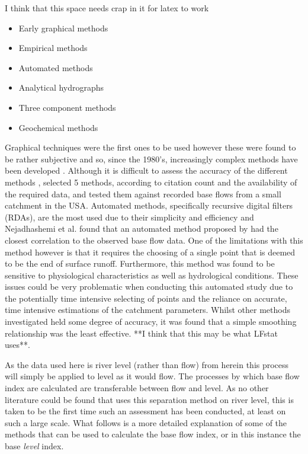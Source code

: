 \documentclass[DIV=calc, paper=a4, fontsize=11pt, twocolumn]{scrartcl}	 %
\begin{document}
I think that this space needs crap in it for latex to work

\begin{itemize}
	\item Early graphical methods
	\item Empirical methods
	\item Automated methods
	\item Analytical hydrographs
	\item Three component methods
	\item Geochemical methods
\end{itemize}

Graphical techniques were the first ones to be used however these were found to be rather subjective and so, since the 1980's, increasingly complex methods have been developed \citet{Li2013}. Although it is difficult to assess the accuracy of the different methods \citep{Li2013}, \citet{Nejadhashemi2009} selected 5 methods, according to citation count and the availability of the required data,  and tested them against recorded base flows from a small catchment in the USA. Automated methods, specifically recursive digital filters (RDAs), are the most used due to their simplicity and efficiency \citet{Li2013} and Nejadhashemi et al. found that an automated method proposed by \citet{Boughton1988} had the closest correlation to the observed base flow data. One of the limitations with this method however is that it requires the choosing of a single point that is deemed to be the end of surface runoff. Furthermore, this method was found to be sensitive to physiological characteristics as well as hydrological conditions. These issues could be very problematic when conducting this automated study due to the potentially time intensive selecting of points and the reliance on accurate, time intensive estimations of the catchment parameters. Whilst other methods investigated held some degree of accuracy, it was found that a simple smoothing relationship was the least effective. **I think that this may be what LFstat uses**.

As the data used here is river level (rather than flow) from herein this process will simply be applied to level as it would flow. The processes by which base flow index are calculated are transferable between flow and level. As no other literature could be found that uses this separation method on river level, this is taken to be the first time such an assessment has been conducted, at least on such a large scale. What follows is a more detailed explanation of some of the methods that can be used to calculate the base flow index, or in this instance the base \textit{level} index.
\end{document}
